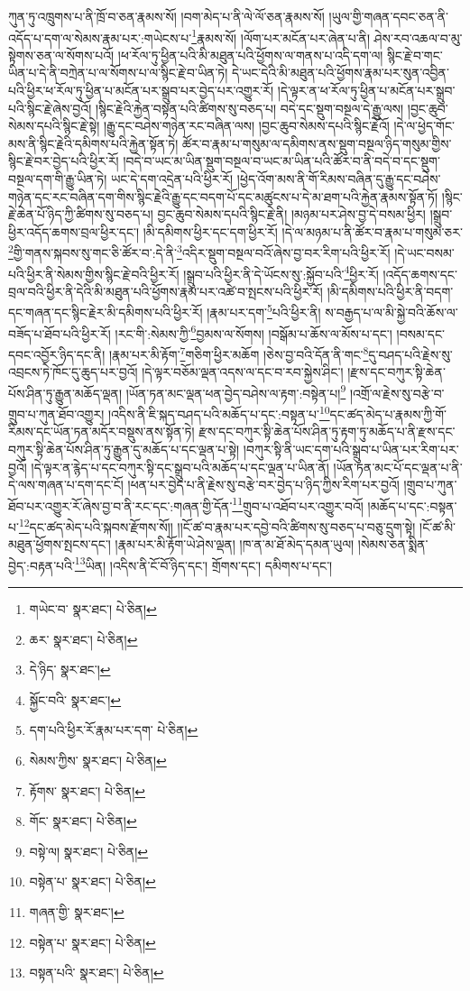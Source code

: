 ཀུན་ཏུ་འཁྲུགས་པ་ནི་ཁྲོ་བ་ཅན་རྣམས་སོ། །བག་མེད་པ་ནི་ལེ་ལོ་ཅན་རྣམས་སོ། །ཡུལ་གྱི་གཞན་དབང་ཅན་ནི་འདོད་པ་དག་ལ་སེམས་རྣམ་པར་:གཡེངས་པ་\footnote{གཡེང་བ་  སྣར་ཐང་།  པེ་ཅིན། }རྣམས་སོ། །ལོག་པར་མངོན་པར་ཞེན་པ་ནི། ཤེས་རབ་འཆལ་བ་མུ་སྟེགས་ཅན་ལ་སོགས་པའོ། །ཕ་རོལ་ཏུ་ཕྱིན་པའི་མི་མཐུན་པའི་ཕྱོགས་ལ་གནས་པ་འདི་དག་ལ། སྙིང་རྗེ་བ་གང་ཡིན་པ་དེ་ནི་བཀྲེན་པ་ལ་སོགས་པ་ལ་སྙིང་རྗེ་བ་ཡིན་ཏེ། དེ་ཡང་དེའི་མི་མཐུན་པའི་ཕྱོགས་རྣམ་པར་སུན་འབྱིན་པའི་ཕྱིར་ཕ་རོལ་ཏུ་ཕྱིན་པ་མངོན་པར་སྒྲུབ་པར་བྱེད་པར་འགྱུར་རོ། །དེ་ལྟར་ན་ཕ་རོལ་ཏུ་ཕྱིན་པ་མངོན་པར་སྒྲུབ་པའི་སྙིང་རྗེ་ཞེས་བྱའོ། །སྙིང་རྗེའི་རྐྱེན་བསྟན་པའི་ཚིགས་སུ་བཅད་པ། བདེ་དང་སྡུག་བསྔལ་དེ་རྒྱུ་ལས། །བྱང་ཆུབ་སེམས་དཔའི་སྙིང་རྗེ་སྟེ། །རྒྱུ་དང་བཤེས་གཉེན་རང་བཞིན་ལས། །བྱང་ཆུབ་སེམས་དཔའི་སྙིང་རྗེའོ། །དེ་ལ་ཕྱེད་གོང་མས་ནི་སྙིང་རྗེའི་དམིགས་པའི་རྐྱེན་སྟོན་ཏེ། ཚོར་བ་རྣམ་པ་གསུམ་ལ་དམིགས་ནས་སྡུག་བསྔལ་ཉིད་གསུམ་གྱིས་སྙིང་རྗེ་བར་བྱེད་པའི་ཕྱིར་རོ། །བདེ་བ་ཡང་མ་ཡིན་སྡུག་བསྔལ་བ་ཡང་མ་ཡིན་པའི་ཚོར་བ་ནི་བདེ་བ་དང་སྡུག་བསྔལ་དག་གི་རྒྱུ་ཡིན་ཏེ། ཡང་དེ་དག་འདྲེན་པའི་ཕྱིར་རོ། །ཕྱེད་འོག་མས་ནི་གོ་རིམས་བཞིན་དུ་རྒྱུ་དང་བཤེས་གཉེན་དང་རང་བཞིན་དག་གིས་སྙིང་རྗེའི་རྒྱུ་དང་བདག་པོ་དང་མཚུངས་པ་དེ་མ་ཐག་པའི་རྐྱེན་རྣམས་སྟོན་ཏོ། །སྙིང་རྗེ་ཆེན་པོ་ཉིད་ཀྱི་ཚིགས་སུ་བཅད་པ། བྱང་ཆུབ་སེམས་དཔའི་སྙིང་རྗེ་ནི། །མཉམ་པར་ཤེས་བྱ་དེ་བསམ་ཕྱིར། །སྒྲུབ་ཕྱིར་འདོད་ཆགས་བྲལ་ཕྱིར་དང་། །མི་དམིགས་ཕྱིར་དང་དག་ཕྱིར་རོ། །དེ་ལ་མཉམ་པ་ནི་ཚོར་བ་རྣམ་པ་གསུམ་ཅར་\footnote{ཆར་  སྣར་ཐང་།  པེ་ཅིན། }གྱི་གནས་སྐབས་སུ་གང་ཅི་ཚོར་བ་:དེ་ནི་\footnote{དེ་ཉིད་  སྣར་ཐང་། }འདིར་སྡུག་བསྔལ་བའོ་ཞེས་བྱ་བར་རིག་པའི་ཕྱིར་རོ། །དེ་ཡང་བསམ་པའི་ཕྱིར་ནི་སེམས་གྱིས་སྙིང་རྗེ་བའི་ཕྱིར་རོ། །སྒྲུབ་པའི་ཕྱིར་ནི་དེ་ཡོངས་སུ་:སྐྱོབ་པའི་\footnote{སྐྱོང་བའི་  སྣར་ཐང་། }ཕྱིར་རོ། །འདོད་ཆགས་དང་བྲལ་བའི་ཕྱིར་ནི་དེའི་མི་མཐུན་པའི་ཕྱོགས་རྣམ་པར་འཚེ་བ་སྤངས་པའི་ཕྱིར་རོ། །མི་དམིགས་པའི་ཕྱིར་ནི་བདག་དང་གཞན་དང་སྙིང་རྗེར་མི་དམིགས་པའི་ཕྱིར་རོ། །རྣམ་པར་དག་\footnote{དག་པའི་ཕྱིར་རོ་རྣམ་པར་དག་  པེ་ཅིན། }པའི་ཕྱིར་ནི། ས་བརྒྱད་པ་ལ་མི་སྐྱེ་བའི་ཆོས་ལ་བཟོད་པ་ཐོབ་པའི་ཕྱིར་རོ། །རང་གི་:སེམས་ཀྱི་\footnote{སེམས་ཀྱིས་  སྣར་ཐང་།  པེ་ཅིན། }བྱམས་ལ་སོགས། །བསྒོམ་པ་ཆོས་ལ་མོས་པ་དང་། །བསམ་དང་དབང་འབྱོར་ཉིད་དང་ནི། །རྣམ་པར་མི་རྟོག་\footnote{རྟོགས་  སྣར་ཐང་།  པེ་ཅིན། }གཅིག་ཕྱིར་མཆོག །ཅེས་བྱ་བའི་དོན་ནི་གང་\footnote{གོང་  སྣར་ཐང་།  པེ་ཅིན། }དུ་བཤད་པའི་རྗེས་སུ་འབྲངས་ཏེ་ཁོང་དུ་ཆུད་པར་བྱའོ། །དེ་ལྟར་བཅོམ་ལྡན་འདས་ལ་དང་བ་རབ་སྐྱེས་ཤིང་། །རྫས་དང་བཀུར་སྟི་ཆེན་པོས་ཤིན་ཏུ་རྒྱུན་མཆོད་ལྡན། །ཡོན་ཏན་མང་ལྡན་ཕན་བྱེད་བཤེས་ལ་རྟག་:བསྟེན་པ།\footnote{བསྟེ་ལ།  སྣར་ཐང་།  པེ་ཅིན། } །འགྲོ་ལ་རྗེས་སུ་བརྩེ་བ་གྲུབ་པ་ཀུན་ཐོབ་འགྱུར། །འདིས་ནི་ཇི་སྐད་བཤད་པའི་མཆོད་པ་དང་:བསྟན་པ་\footnote{བསྟེན་པ་  སྣར་ཐང་།  པེ་ཅིན། }དང་ཚད་མེད་པ་རྣམས་ཀྱི་གོ་རིམས་དང་ཡོན་ཏན་མདོར་བསྡུས་ནས་སྟོན་ཏེ། རྫས་དང་བཀུར་སྟི་ཆེན་པོས་ཤིན་ཏུ་རྟག་ཏུ་མཆོད་པ་ནི་རྫས་དང་བཀུར་སྟི་ཆེན་པོས་ཤིན་ཏུ་རྒྱུན་དུ་མཆོད་པ་དང་ལྡན་པ་སྟེ། །བཀུར་སྟི་ནི་ཡང་དག་པའི་སྒྲུབ་པ་ཡིན་པར་རིག་པར་བྱའོ། །དེ་ལྟར་ན་རྙེད་པ་དང་བཀུར་སྟི་དང་སྒྲུབ་པའི་མཆོད་པ་དང་ལྡན་པ་ཡིན་ནོ། །ཡོན་ཏན་མང་པོ་དང་ལྡན་པ་ནི་དེ་ལས་གཞན་པ་དག་དང་ངོ། །ཕན་པར་བྱེད་པ་ནི་རྗེས་སུ་བརྩེ་བར་བྱེད་པ་ཉིད་ཀྱིས་རིག་པར་བྱའོ། །གྲུབ་པ་ཀུན་ཐོབ་པར་འགྱུར་རོ་ཞེས་བྱ་བ་ནི་རང་དང་:གཞན་གྱི་དོན་\footnote{གཞན་གྱི་  སྣར་ཐང་། }གྲུབ་པ་འཐོབ་པར་འགྱུར་བའོ། །མཆོད་པ་དང་:བསྟན་པ་\footnote{བསྟེན་པ་  སྣར་ཐང་།  པེ་ཅིན། }དང་ཚད་མེད་པའི་སྐབས་རྫོགས་སོ།། །།ངོ་ཚ་བ་རྣམ་པར་དབྱེ་བའི་ཚིགས་སུ་བཅད་པ་བཅུ་དྲུག་སྟེ། །ངོ་ཚ་མི་མཐུན་ཕྱོགས་སྤངས་དང་། །རྣམ་པར་མི་རྟོག་ཡེ་ཤེས་ལྡན། །ཁ་ན་མ་ཐོ་མེད་དམན་ཡུལ། །སེམས་ཅན་སྨིན་བྱེད་:བརྟན་པའི་\footnote{བསྟན་པའི་  སྣར་ཐང་།  པེ་ཅིན། }ཡིན། །འདིས་ནི་ངོ་བོ་ཉིད་དང་། གྲོགས་དང་། དམིགས་པ་དང་། 